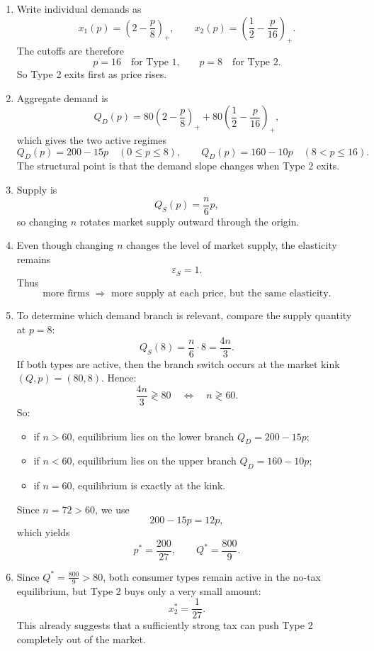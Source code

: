 \documentclass[12pt]{article}
\begin{document}
\begin{enumerate}[label=(\alph*)]
    \item
    Write individual demands as
    \[
    x_1(p)=\left(2-\frac{p}{8}\right)_+,
    \qquad
    x_2(p)=\left(\frac12-\frac{p}{16}\right)_+.
    \]
    The cutoffs are therefore
    \[
    p=16 \quad\text{for Type 1,}
    \qquad
    p=8 \quad\text{for Type 2.}
    \]
    So Type 2 exits first as price rises.

    \item
    Aggregate demand is
    \[
    Q_D(p)=80\left(2-\frac{p}{8}\right)_+ + 80\left(\frac12-\frac{p}{16}\right)_+,
    \]
    which gives the two active regimes
    \[
    Q_D(p)=200-15p \quad (0\le p\le 8),
    \qquad
    Q_D(p)=160-10p \quad (8<p\le 16).
    \]
    The structural point is that the demand slope changes when Type 2 exits.

    \item
    Supply is
    \[
    Q_S(p)=\frac{n}{6}p,
    \]
    so changing \(n\) rotates market supply outward through the origin.

    \item
    Even though changing \(n\) changes the level of market supply, the elasticity remains
    \[
    \varepsilon_S=1.
    \]
    Thus
    \[
    \boxed{\text{more firms } \Rightarrow \text{ more supply at each price, but the same elasticity}.}
    \]

    \item
    To determine which demand branch is relevant, compare the supply quantity at \(p=8\):
    \[
    Q_S(8)=\frac{n}{6}\cdot 8=\frac{4n}{3}.
    \]
    If both types are active, then the branch switch occurs at the market kink \((Q,p)=(80,8)\). Hence:
    \[
    \frac{4n}{3} \gtrless 80
    \quad\Longleftrightarrow\quad
    n \gtrless 60.
    \]
    So:
    \begin{itemize}[leftmargin=*]
        \item if \(n>60\), equilibrium lies on the lower branch \(Q_D=200-15p\);
        \item if \(n<60\), equilibrium lies on the upper branch \(Q_D=160-10p\);
        \item if \(n=60\), equilibrium is exactly at the kink.
    \end{itemize}
    Since \(n=72>60\), we use
    \[
    200-15p=12p,
    \]
    which yields
    \[
    \boxed{p^*=\frac{200}{27},\qquad Q^*=\frac{800}{9}.}
    \]

    \item
    Since \(Q^*=\frac{800}{9}>80\), both consumer types remain active in the no-tax equilibrium, but Type 2 buys only a very small amount:
    \[
    x_2^*=\frac{1}{27}.
    \]
    This already suggests that a sufficiently strong tax can push Type 2 completely out of the market.


\end{enumerate}
\end{document}
